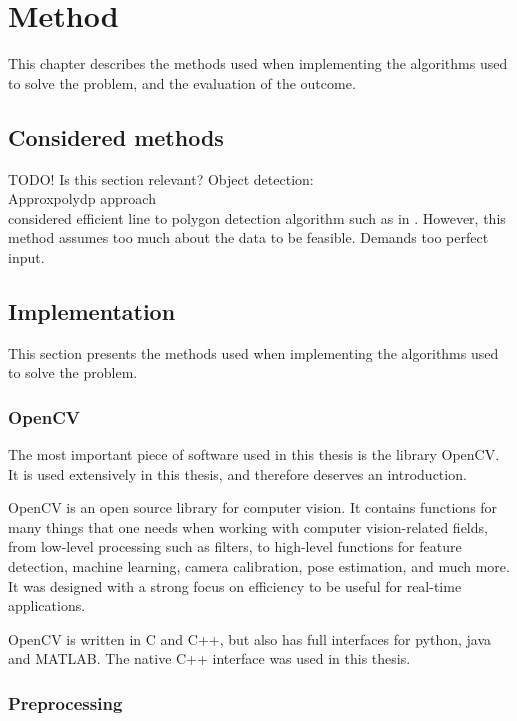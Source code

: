 \chapter{Method}

This chapter describes the methods used when implementing the algorithms used to solve the problem, and the evaluation of the outcome.

\section{Considered methods}
TODO! Is this section relevant? %
Object detection: \\
Approxpolydp approach\\
considered efficient line to polygon detection algorithm such as in \cite{joaquim2003polygon}.
However, this method assumes too much about the data to be feasible. Demands too perfect input.

\section{Implementation}
This section presents the methods used when implementing the algorithms used to solve the problem. %

\subsection{OpenCV} %
The most important piece of software used in this thesis is the library OpenCV.
It is used extensively in this thesis, and therefore deserves an introduction.

OpenCV is an open source library for computer vision. %
It contains functions for many things that one needs when working with computer vision-related fields, from low-level processing such as filters, to high-level functions for feature detection, machine learning, camera calibration, pose estimation, and much more.
It was designed with a strong focus on efficiency to be useful for real-time applications. \cite{bradski2008learning}

OpenCV is written in C and C++, but also has full interfaces for python, java and MATLAB\cite{wiki:OpenCV}.
The native C++ interface was used in this thesis. %

\subsection{Preprocessing}

